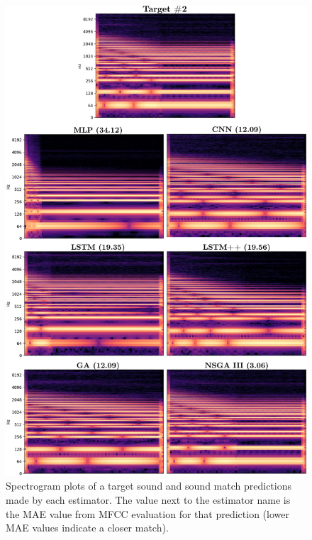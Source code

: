 \begin{figure}[t]
\begin{center}
\includegraphics[width=1.0\columnwidth]{spect_group_v1.png}
\caption{Spectrogram plots of a target sound and sound match predictions made by each estimator. The value next to the estimator name is the MAE value from MFCC evaluation for that prediction (lower MAE values indicate a closer match).}
\label{fig:group_spect}
\end{center}
\end{figure}

